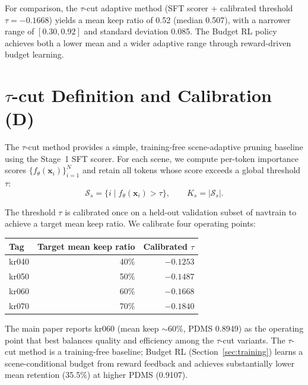 \documentclass[letterpaper]{article}
\begin{document}
For comparison, the $\tau$-cut adaptive method (SFT scorer + calibrated threshold $\tau{=}{-}0.1668$)
yields a mean keep ratio of 0.52 (median 0.507), with a narrower range of $[0.30, 0.92]$ and
standard deviation 0.085. The Budget RL policy achieves both a lower mean and a wider adaptive range
through reward-driven budget learning.

\section{$\tau$-cut Definition and Calibration (D)}
\label{sec:taucut}

The $\tau$-cut method provides a simple, training-free scene-adaptive pruning baseline using the
Stage~1 SFT scorer. For each scene, we compute per-token importance scores
$\{f_\theta(\mathbf{x}_i)\}_{i=1}^{N}$ and retain all tokens whose score exceeds a global threshold
$\tau$:
\begin{equation}
\mathcal{S}_s = \{i \mid f_\theta(\mathbf{x}_i) > \tau\},
\qquad K_s = |\mathcal{S}_s|.
\end{equation}

The threshold $\tau$ is calibrated once on a held-out validation subset of navtrain to achieve a
target mean keep ratio. We calibrate four operating points:
\begin{center}
\begin{tabular}{@{}lrr@{}}
\toprule
Tag & Target mean keep ratio & Calibrated $\tau$ \\
\midrule
kr040 & 40\% & $-0.1253$ \\
kr050 & 50\% & $-0.1487$ \\
kr060 & 60\% & $-0.1668$ \\
kr070 & 70\% & $-0.1840$ \\
\bottomrule
\end{tabular}
\end{center}

The main paper reports kr060 (mean keep $\sim$60\%, PDMS 0.8949) as the operating point that best
balances quality and efficiency among the $\tau$-cut variants. The $\tau$-cut method is a
training-free baseline; Budget RL (Section~\ref{sec:training}) learns a scene-conditional budget
from reward feedback and achieves substantially lower mean retention (35.5\%) at higher PDMS
(0.9107).

\end{document}

